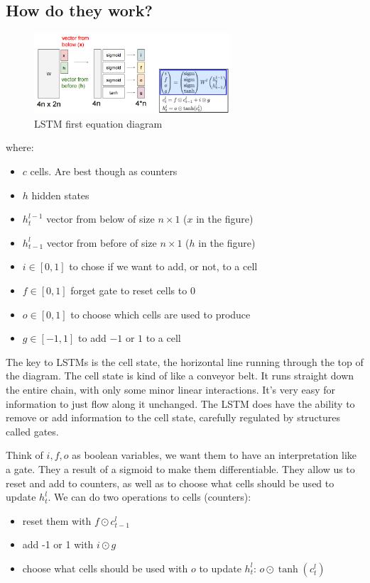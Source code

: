 \subsection*{How do they work?}
\begin{figure}[h]
  \centering
  \includegraphics[width=0.65\textwidth]{Images/recurrent_neural_networks/9.png}
  \caption{LSTM first equation diagram}
\end{figure}
 where:
\begin{itemize}
\item $c$ cells. Are best though as counters
\item $h$ hidden states
\item $h_t^{l-1}$ vector from below of size $n \times 1$ ($x$ in the figure)
\item $h_{t-1}^{l}$ vector from before of size $n \times 1$ ($h$ in the figure)
\item $i \in [0,1]$ to chose if we want to add, or not, to a cell
\item $f \in [0,1]$ forget gate to reset cells to $0$
\item $o \in [0,1]$ to choose which cells are used to produce
\item $g \in [-1,1]$ to add $-1$ or $1$ to a cell
\end{itemize}

The key to LSTMs is the cell state, the horizontal line running through the top of the diagram. The cell state is kind of like a conveyor belt. It runs straight down the entire chain, with only some minor linear interactions. It’s very easy for information to just flow along it unchanged. The LSTM does have the ability to remove or add information to the cell state, carefully regulated by structures called gates.

Think of $i,f,o$ as boolean variables, we want them to have an interpretation like a gate. They a result of a sigmoid to make them differentiable. They allow us to reset and add to counters, as well as to choose what cells should be used to update $h^l_t$. We can do two operations to cells (counters):
\begin{itemize}
\item reset them with $f \odot c^l_{t-1}$
\item add -1 or 1 with $i \odot g$
\item choose what cells should be used with $o$ to update $h^l_t$: $o \odot \tanh(c^l_t)$
\end{itemize}


